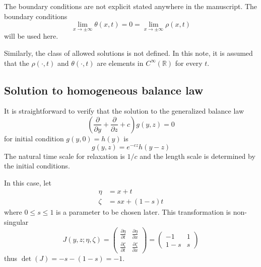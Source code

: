 \documentclass[12pt]{amsart}
\begin{document}
The boundary conditions are not explicit stated anywhere in the
manuscript.  The boundary conditions
\begin{equation}
  \lim_{x\rightarrow \pm\infty} \theta(x, t) = 0 =
  \lim_{x\rightarrow \pm\infty} \rho(x, t) 
\end{equation}
will be used here.

Similarly, the class of allowed solutions is not defined.  In this
note, it is assumed that the $\rho(\cdot, t)$ and $\theta(\cdot,
t)$ are elements in $C^{\infty}(\mathbb{R})$ for every $t$.

\subsection{Solution to homogeneous balance law}

It is straightforward to verify that the
solution to the generalized balance law 
\begin{equation}
  \left(\frac{\partial}{\partial y} + 
  \frac{\partial}{\partial z} + c\right)g(y, z) = 0
  \label{eq:homogeneous_conservation_law}
\end{equation}
for initial condition $g(y, 0) = h(y)$ is~\cite[Equation 4.2.1.1]{PolyaninSaitsevMoussiaux:2002}
\begin{equation}
  g(y, z) = e^{-cz}h(y-z)
  \label{eq:homogeneous_conservation_solution}
\end{equation}
The natural time scale for relaxation is $1/c$ and the length scale is
determined by the initial conditions.

In this case, let
\begin{align}
  \eta &= x+t \\
  \zeta &= sx+(1-s)t
\end{align}
where $0\le s\le 1$ is a parameter to be chosen later.
This transformation is non-singular
\begin{equation}
  J(y, z; \eta, \zeta) =
  \begin{pmatrix}
    \frac{\partial\eta}{\partial t} & \frac{\partial \eta}{\partial x} \\
    \frac{\partial\zeta}{\partial t} & \frac{\partial\zeta}{\partial x} 
  \end{pmatrix}
  =
  \begin{pmatrix}
    -1 & 1 \\
    1-s & s 
  \end{pmatrix}
\end{equation}
thus $\det(J) = -s - (1-s) = -1$.
\end{document}
